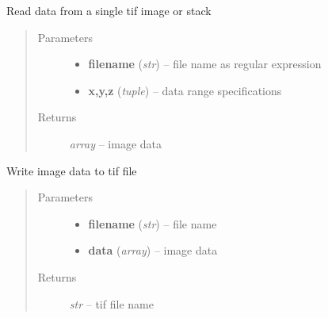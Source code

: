 \documentclass[letterpaper,10pt,english]{sphinxmanual}
\begin{document}

\begin{fulllineitems}
\label{api/ClearMap.IO:ClearMap.IO.TIF.readData}
Read data from a single tif image or stack
\begin{quote}\begin{description}
\item[{Parameters}] \leavevmode\begin{itemize}
\item {} 
\textbf{filename} (\emph{str}) --
file name as regular expression

\item {} 
\textbf{x,y,z} (\emph{tuple}) --
data range specifications

\end{itemize}

\item[{Returns}] \leavevmode
\emph{array} --
image data

\end{description}\end{quote}

\end{fulllineitems}


\begin{fulllineitems}
\label{api/ClearMap.IO:ClearMap.IO.TIF.writeData}
Write image data to tif file
\begin{quote}\begin{description}
\item[{Parameters}] \leavevmode\begin{itemize}
\item {} 
\textbf{filename} (\emph{str}) --
file name

\item {} 
\textbf{data} (\emph{array}) --
image data

\end{itemize}

\item[{Returns}] \leavevmode
\emph{str} --
tif file name

\end{description}\end{quote}

\end{fulllineitems}
\end{document}
